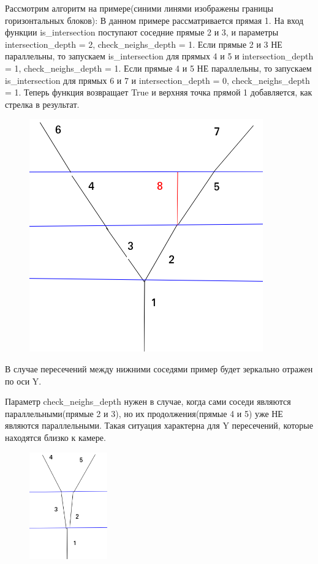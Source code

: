 Рассмотрим алгоритм на примере(синими линями изображены границы горизонтальных блоков): 
\newline
В данном примере рассматривается прямая 1. \newline На вход функции is\_intersection поступают соседние прямые 2 и 3, и параметры intersection\_depth = 2, check\_neighs\_depth = 1.
\newline
Если прямые 2 и 3 НЕ параллельны, то запускаем is\_intersection для прямых 4 и 5 и intersection\_depth = 1, check\_neighs\_depth = 1.
\newline
Если прямые 4 и 5 НЕ параллельны, то запускаем  is\_intersection для прямых 6 и 7 и intersection\_depth = 0, check\_neighs\_depth = 1. Теперь функция возвращает True и верхняя точка прямой 1 добавляется, как стрелка в результат.
\begin{figure}[!h]
	\centering
	\includegraphics[width=0.7\linewidth]{pictures/intersection_example}
	\caption[Intersection]{}
	\label{fig:intersectionexample}
\end{figure}

В случае пересечений между нижними соседями пример будет зеркально отражен по оси Y.

\newpage
Параметр check\_neighs\_depth нужен в случае, когда сами соседи являются параллельными(прямые 2 и 3), но их продолжения(прямые 4 и 5) уже НЕ являются параллельными. Такая ситуация характерна для Y пересечений, которые находятся близко к камере.
\begin{figure}[!h]
	\centering
	\includegraphics[width=0.3\textwidth, height=0.2\textheight]{pictures/intersection_example1}
	\caption{}
	\label{fig:intersectionexample1}
\end{figure}

